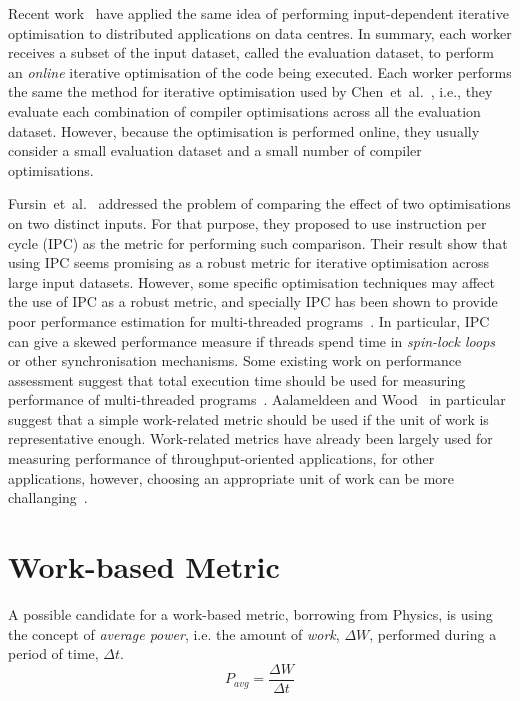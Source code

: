\documentclass[sigplan,9pt]{acmart}
\newcommand{\etal}{et~al.}
\begin{document}
Recent work~\cite{chen12b,fang15} have applied the same idea of performing
input-dependent iterative optimisation to distributed applications on data centres.
In summary, each worker receives a subset of the input dataset, called the evaluation dataset,
to perform an \textit{online} iterative optimisation of the code being executed.
Each worker performs the same the method for iterative optimisation used by Chen~\etal~\cite{chen10,chen12a},
i.e., they evaluate each combination of compiler optimisations across all the evaluation dataset.
However, because the optimisation is performed online, they usually consider a small evaluation dataset
and a small number of compiler optimisations.

Fursin~\etal~\cite{fursin07} addressed the problem of comparing the effect of two optimisations
on two distinct inputs. For that purpose, they proposed to use instruction per cycle (IPC) as the metric for performing such comparison.
Their result show that using IPC seems promising as a robust metric for iterative optimisation
across large input datasets.
However, 
some specific optimisation techniques may affect the use of IPC as a robust metric, and specially
IPC has been shown to provide poor performance estimation for multi-threaded programs~\cite{alameldeen06,eyerman08}.
In particular, IPC can give a skewed performance measure if threads spend time in \textit{spin-lock loops}
or other synchronisation mechanisms. 
Some existing work on performance assessment suggest that
total execution time should be used for measuring performance of multi-threaded programs~\cite{alameldeen06,eyerman08}.
Aalameldeen and Wood~\cite{alameldeen06} in particular suggest that a simple work-related metric should be used
if the unit of work is representative enough.
Work-related metrics have already been largely used for measuring performance of throughput-oriented applications,
for other applications, however, choosing an appropriate unit of work can be more challanging~\cite{alameldeen06}.

\section{Work-based Metric} \label{sec:metric}

A possible candidate for a work-based metric, borrowing from Physics,
is using the concept of \textit{average power}, i.e. the amount of
\textit{work}, $\Delta W$, performed during a period of time, $\Delta t$.
\[
   P_{avg} = \frac{\Delta W}{\Delta t}
\]
\end{document}
